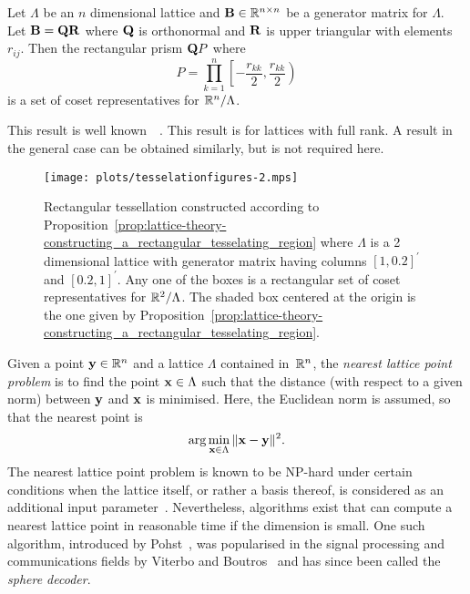 \documentclass[journal]{IEEEtran}
\begin{document}
\begin{proposition}\label{prop:lattice-theory-constructing_a_rectangular_tesselating_region}
Let  $\Lambda$ be an $n$ dimensional lattice and $\mathbf{B} \in {\mathbb R}^{n\times n}$ be a generator matrix for $\Lambda$. Let $\mathbf{B} = \mathbf{Q}\mathbf{R}$ where $\mathbf{Q}$ is orthonormal and $\mathbf{R}$ is upper triangular with elements $r_{ij}$.  Then the rectangular prism $\mathbf{Q} P$ where
\[
P = \prod_{k=1}^{n}{\left[-\frac{r_{kk}}{2}, \frac{r_{kk}}{2}\right)}
\]
is a set of coset representatives for ${\mathbb R}^n / \Lambda$.
\end{proposition}
\begin{IEEEproof}
This result is well known~\cite[Chapter IX, Theorem IV]{Cassels_geom_numbers_1997}~\cite[Proposition 2.1]{McKilliam2010thesis}.  This result is for lattices with full rank.  A result in the general case can be obtained similarly, but is not required here.  
\end{IEEEproof}

\begin{figure}[tp]
	\centering
		\texttt{[image: plots/tesselationfigures-2.mps]}
		\caption{Rectangular tessellation constructed according to Proposition~\ref{prop:lattice-theory-constructing_a_rectangular_tesselating_region} where $\Lambda$ is a 2 dimensional lattice with generator matrix having columns $[1, 0.2]^\prime$ and $[0.2, 1]^\prime$. Any one of the boxes is a rectangular set of coset representatives for ${\mathbb R}^2 / \Lambda$.  The shaded box centered at the origin is the one given by Proposition~\ref{prop:lattice-theory-constructing_a_rectangular_tesselating_region}.}
		\label{lattices:fig:tessellation2}
\end{figure} 

Given a point $\mathbf{y}\in{\mathbb R}^n$ and a lattice $\Lambda$ contained in~${\mathbb R}^n$, the \emph{nearest lattice point problem} is to find the point $\mathbf{x} \in \Lambda$ such that the distance (with respect to a given norm) between $\mathbf{y}$ and $\mathbf{x}$ is minimised.  Here, the Euclidean norm is assumed, so that the nearest point is
\[ 
\arg\min_{\mathbf{x} \in \Lambda} \| \mathbf{x} - \mathbf{y} \|^2.
\]
The nearest lattice point problem is known to be NP-hard under certain conditions when the lattice itself, or rather a basis thereof, is considered as an additional input parameter~\cite{micciancio_hardness_2001, Jalden2005_sphere_decoding_complexity}. Nevertheless, algorithms exist that can compute a nearest lattice point in reasonable time if the dimension is small. One such algorithm, introduced by Pohst~\cite{Pohst_sphere_decoder_1981}, was popularised in the signal processing and communications fields by Viterbo and Boutros~\cite{Viterbo_sphere_decoder_1999} and has since been called the \emph{sphere decoder}. 
\end{document}
